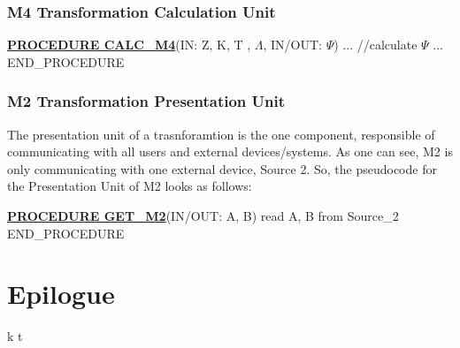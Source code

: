 \documentclass{article}
\begin{document}
\subsubsection{M4 Transformation Calculation Unit}
\begin{algorithmic}[H]
\STATE \underline{\textbf{PROCEDURE CALC\_M4}}(IN: Z, K, T , $\Lambda$, IN/OUT: $\Psi$)
	\STATE ...
	\STATE //calculate $\Psi$
	\STATE ...
\STATE END\_PROCEDURE
\end{algorithmic}

\subsubsection{M2 Transformation Presentation Unit}
The presentation unit of a trasnforamtion is the one component, responsible of communicating with all users
and external devices/systems. As one can see, M2 is only communicating with one external device, Source 2.
So, the pseudocode for the Presentation Unit of M2 looks as follows:
\begin{algorithmic}[H]
\STATE \underline{\textbf{PROCEDURE GET\_M2}}(IN/OUT: A, B)
	\STATE read A, B from Source\_2
\STATE END\_PROCEDURE
\end{algorithmic}



\section{Epilogue}
k t     
\end{document}

